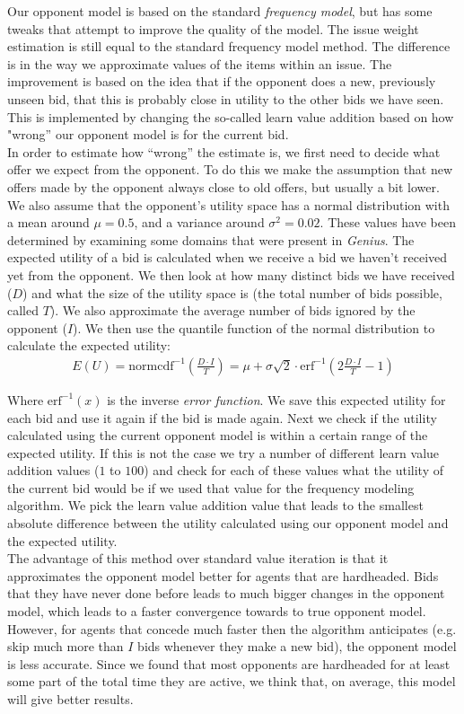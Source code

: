 Our opponent model is based on the standard \emph{frequency model}, but has some tweaks that attempt to improve the quality of the model. The issue weight estimation is still equal to the standard frequency model method. The difference is in the way we approximate values of the items within an issue. The improvement is based on the idea that if the opponent does a new, previously unseen bid, that this is probably close in utility to the other bids we have seen. This is implemented by changing the so-called learn value addition based on how "wrong'' our opponent model is for the current bid. \\

In order to estimate how ``wrong'' the estimate is, we first need to decide what offer we expect from the opponent. 
To do this we make the assumption that new offers made by the opponent always close to old offers, but usually a bit lower. 
We also assume that the opponent's utility space has a normal distribution with a mean around $\mu = 0.5$, and a variance around $\sigma^2 = 0.02$. These values have been determined by examining some domains that were present in \textit{Genius}. The expected utility of a bid is calculated when we receive a bid we haven't received yet from the opponent. We then look at how many distinct bids we have received ($D$) and what the size of the utility space is (the total number of bids possible, called $T$). We also approximate the average number of bids ignored by the opponent ($I$). We then use the quantile function of the normal distribution to calculate the expected utility:
\begin{align}
  E(U) = \text{normcdf}^{-1} \left(\frac{D \cdot I}{T}\right) = \mu + \sigma \sqrt{2} \cdot \text{erf}^{-1} \left(2 \frac{D \cdot I}{T} - 1\right)
\end{align}

Where $\text{erf}^{-1}(x)$ is the inverse \emph{error function}. We save this expected utility for each bid and use it again if the bid is made again. Next we check if the utility calculated using the current opponent model is within a certain range of the expected utility. If this is not the case we try a number of different learn value addition values ($1$ to $100$) and check for each of these values what the utility of the current bid would be if we used that value for the frequency modeling algorithm. We pick the learn value addition value that leads to the smallest absolute difference between the utility calculated using our opponent model and the expected utility. \\

The advantage of this method over standard value iteration is that it approximates the opponent model better for agents that are hardheaded. Bids that they have never done before leads to much bigger changes in the opponent model, which leads to a faster convergence towards to true opponent model. However, for agents that concede much faster then the algorithm anticipates (e.g. skip much more than $I$ bids whenever they make a new bid), the opponent model is less accurate. Since we found that most opponents are hardheaded for at least some part of the total time they are active, we think that, on average, this model will give better results.
